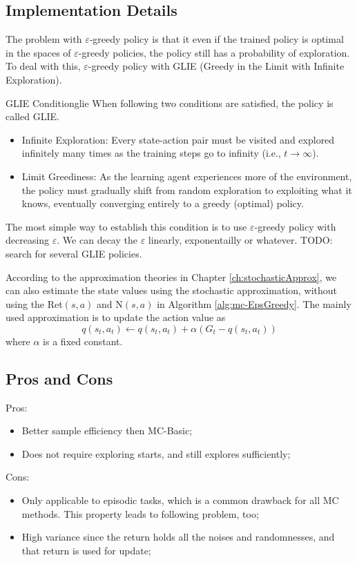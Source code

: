     \subsection{Implementation Details}
        The problem with $\varepsilon$-greedy policy is that it even if the trained policy is optimal in the
        spaces of $\varepsilon$-greedy policies, the policy still has a probability of exploration. To deal with this,
        $\varepsilon$-greedy policy with GLIE (Greedy in the Limit with Infinite Exploration).
        \begin{defn}{GLIE Condition}{glie}
            When following two conditions are satisfied, the policy is called GLIE.
            \begin{itemize}
                \item Infinite Exploration: Every state-action pair must be visited and explored infinitely many times as the training steps go to infinity (i.e., $t \to \infty$).
                \item Limit Greediness: As the learning agent experiences more of the environment, the policy must gradually shift from random exploration to exploiting what it knows, eventually converging entirely to a greedy (optimal) policy.
            \end{itemize}
        \end{defn}
        The most simple way to establish this condition is to use $\varepsilon$-greedy policy with decreasing $\varepsilon$. We can decay the $\varepsilon$ linearly, exponentailly or whatever.
        TODO: search for several GLIE policies.

        According to the approximation theories in Chapter \ref{ch:stochasticApprox}, we can also estimate the state values using the stochastic approximation, without using the Ret$(s,a)$ and N$(s,a)$ in Algorithm \ref{alg:mc-EpsGreedy}.
        The mainly used approximation is to update the action value as
        \begin{equation}
            q(s_t,a_t) \leftarrow q(s_t, a_t) + \alpha(G_t - q(s_t,a_t))
        \end{equation}
        where $\alpha$ is a fixed constant.

    \subsection{Pros and Cons}
        Pros:
        \begin{itemize}
            \item Better sample efficiency then MC-Basic;
            \item Does not require exploring starts, and still explores sufficiently;
        \end{itemize}
        Cons:
        \begin{itemize}
            \item Only applicable to episodic tasks, which is a common drawback for all MC methods. This property leads to following problem, too;
            \item High variance since the return holds all the noises and randomnesses, and that return is used for update;
        \end{itemize}